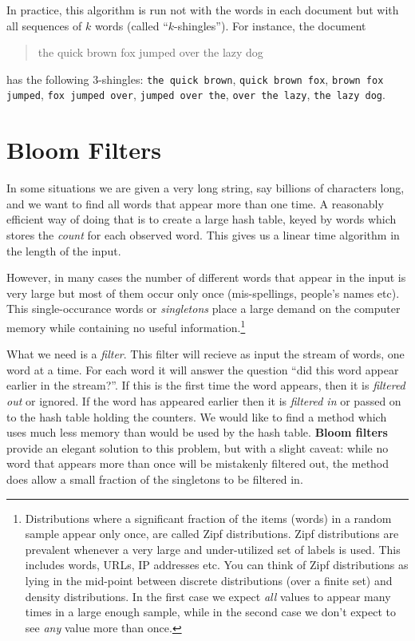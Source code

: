 In practice, this algorithm is run not with the words in each document but with all 
sequences of $k$ words (called ``$k$-shingles''). For instance, the document
\begin{quote}
the quick brown fox jumped over the lazy dog
\end{quote}
has the following 3-shingles: {\tt the quick brown}, {\tt quick brown fox}, {\tt brown fox 
jumped}, {\tt fox jumped over}, {\tt jumped over the}, {\tt over the lazy}, {\tt the lazy dog}.

\section{Bloom Filters}

In some situations we are given a very long string, say billions of
characters long, and we want to find all words that appear more than
one time. A reasonably efficient way of doing that is to create a large hash
table, keyed by words which stores the {\em count} for each
observed word.  This gives us a linear time algorithm in the length of
the input. 

However, in many cases the number of different words that appear in
the input is very large but most of them occur only once
(mis-spellings, people's names etc). This single-occurance words or
{\em singletons} place a large demand on the computer memory while
containing no useful information.\footnote{ Distributions where a
  significant fraction of the items (words) in a random sample appear
  only once, are called Zipf distributions.  Zipf distributions are
  prevalent whenever a very large and under-utilized set of labels is
  used. This includes words, URLs, IP addresses etc.  You can think of
  Zipf distributions as lying in the mid-point between discrete
  distributions (over a finite set) and density distributions. In the
  first case we expect {\em all} values to appear many times in a
  large enough sample, while in the second case we don't expect to see
  {\em any} value more than once.}

What we need is a {\em filter}. This filter will recieve as input the
stream of words, one word at a time. For each word it will answer the
question ``did this word appear earlier in the stream?''. If this is
the first time the word appears, then it is {\em filtered out} or
ignored. If the word has appeared earlier then it is {\em filtered in}
or passed on to the hash table holding the counters. We would like to
find a method which uses much less memory than would be used by the
hash table.  {\bf Bloom filters} provide an elegant solution to this
problem, but with a slight caveat: while no word that appears more
than once will be mistakenly filtered out, the method does allow a
small fraction of the singletons to be filtered in.

